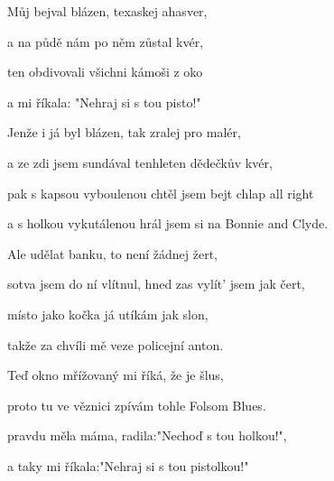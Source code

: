 

\zs
Můj  bejval blázen, texaskej ahasver,

a na půdě nám po něm zůstal  kvér,

ten  obdivovali všichni kámoši z oko

a  mi říkala: "Nehraj si s tou pisto!"
\ks

\zs
Jenže i já byl blázen, tak zralej pro malér,

a ze zdi jsem sundával tenhleten dědečkův kvér,

pak s kapsou vyboulenou chtěl jsem bejt chlap all right

a s holkou vykutálenou hrál jsem si na Bonnie and Clyde.
\ks

\zs
Ale udělat banku, to není žádnej žert,

sotva jsem do ní vlítnul, hned zas vylít' jsem jak čert,

místo jako kočka já utíkám jak slon,

takže za chvíli mě veze policejní anton.

\ks

\zs
Teď okno mřížovaný mi říká, že je šlus,

proto tu ve věznici zpívám tohle Folsom Blues.

pravdu měla máma, radila:"Nechoď s tou holkou!",

a taky mi říkala:"Nehraj si s tou pistolkou!"
\ks

\kp







